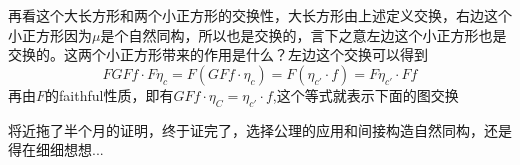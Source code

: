 \documentclass{article}
\begin{document}
再看这个大长方形和两个小正方形的交换性，大长方形由上述定义交换，右边这个小正方形因为$\mu$是个自然同构，所以也是交换的，言下之意左边这个小正方形也是交换的。这两个小正方形带来的作用是什么？左边这个交换可以得到\[FGFf \cdot F\eta_c = F(GFf \cdot \eta_c) = F(\eta_{c'} \cdot f) = F\eta_{c'} \cdot Ff\]再由$F$的faithful性质，即有$GFf \cdot \eta_C = \eta_{c'} \cdot f$,这个等式就表示下面的图交换

\begin{center}
\end{center}

将近拖了半个月的证明，终于证完了，选择公理的应用和间接构造自然同构，还是得在细细想想...
\end{document}

